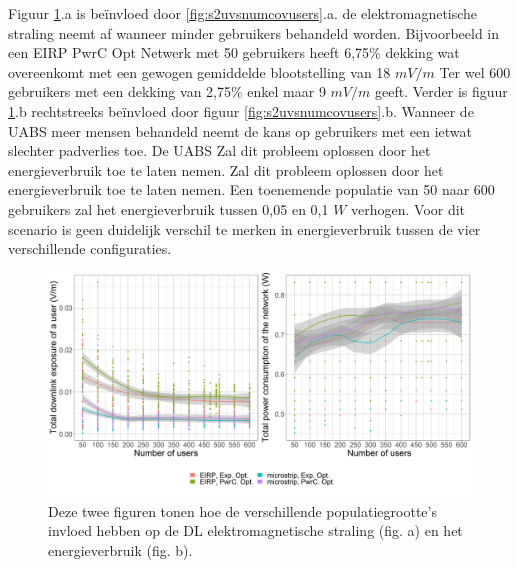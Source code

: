 \documentclass[twocolumn]{phdsymp} %
\begin{document}
Figuur  \ref{fig:s2b_dlAndPc}.a  is be\"invloed door \ref{fig:s2uvsnumcovusers}.a. 
de elektromagnetische straling neemt af wanneer minder gebruikers behandeld worden.
Bijvoorbeeld in een EIRP \gls{PwrC Opt} Netwerk met 50 gebruikers heeft 6,75\%
dekking wat overeenkomt met een gewogen gemiddelde blootstelling van 18 $mV/m$
Ter wel 600 gebruikers met een dekking van 2,75\% enkel maar 9 $mV/m$ geeft.
Verder is figuur \ref{fig:s2b_dlAndPc}.b rechtstreeks be\"invloed door figuur  \ref{fig:s2uvsnumcovusers}.b.
Wanneer de \gls{UABS} meer mensen behandeld neemt de kans op gebruikers met een ietwat slechter padverlies toe.
De  \gls{UABS} Zal dit probleem oplossen door het energieverbruik toe te laten nemen.
Zal dit probleem oplossen door het energieverbruik toe te laten nemen.
Een toenemende populatie van 50 naar 600 gebruikers zal het energieverbruik tussen 0,05 en 0,1 $W$ verhogen.
Voor dit scenario is geen duidelijk verschil te merken in energieverbruik tussen de vier verschillende configuraties.


\begin{figure}[h!]
  \includegraphics[width=\linewidth]{../results/s2/uvsdlAndPc.png}
  \caption{Deze twee figuren tonen hoe de verschillende populatiegrootte's invloed hebben op de \acs{DL} elektromagnetische straling (fig. a) en het energieverbruik (fig. b).}
  \label{fig:s2b_dlAndPc}
\end{figure}
\end{document}
